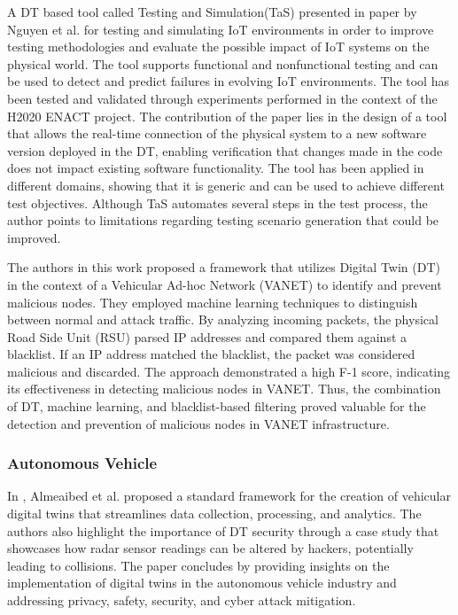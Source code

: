 A DT based tool called Testing and Simulation(TaS) presented in\cite{luongnguyenDigitalTwinIoT2022} paper by Nguyen et al. for testing and simulating IoT environments in order to improve testing methodologies and evaluate the possible impact of IoT systems on the physical world. The tool supports functional and nonfunctional testing and can be used to detect and predict failures in evolving IoT environments. The tool has been tested and validated through experiments performed in the context of the H2020 ENACT project. The contribution of the paper lies in the design of a tool that allows the real-time connection of the physical system to a new software version deployed in the DT, enabling verification that changes made in the code does not impact existing software functionality. The tool has been applied in different domains, showing that it is generic and can be used to achieve different test objectives. Although TaS automates several steps in the test process, the author points to limitations regarding testing scenario generation that could be improved.

The authors in this \cite{aryaDetectionMaliciousNode2023a} work proposed a framework that utilizes Digital Twin (DT) in the context of a Vehicular Ad-hoc Network (VANET) to identify and prevent malicious nodes. They employed machine learning techniques to distinguish between normal and attack traffic. By analyzing incoming packets, the physical Road Side Unit (RSU) parsed IP addresses and compared them against a blacklist. If an IP address matched the blacklist, the packet was considered malicious and discarded. The approach demonstrated a high F-1 score, indicating its effectiveness in detecting malicious nodes in VANET. Thus, the combination of DT, machine learning, and blacklist-based filtering proved valuable for the detection and prevention of malicious nodes in VANET infrastructure.








\subsubsection*{Autonomous Vehicle}
In \cite{almeaibedDigitalTwinAnalysis2021}, Almeaibed et al. proposed a standard framework for the creation of vehicular digital twins that streamlines data collection, processing, and analytics. The authors also highlight the importance of DT security through a case study that showcases how radar sensor readings can be altered by hackers, potentially leading to collisions. The paper concludes by providing insights on the implementation of digital twins in the autonomous vehicle industry and addressing privacy, safety, security, and cyber attack mitigation.

